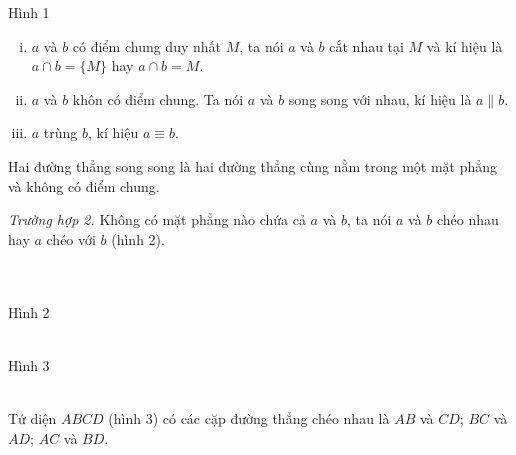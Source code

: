 \begin{center}
Hình 1
\end{center}
\begin{enumerate}[i)]
\item $a$ và $b$ có điểm chung duy nhất $M$, ta nói $a$ và $b$ cắt nhau tại $M$ và kí hiệu là $a\cap b=\{M\}$ hay $a\cap b=M$.
\item $a$ và $b$ khôn có điểm chung. Ta nói $a$ và $b$ song song với nhau, kí hiệu là $a\parallel b$.
\item $a$ trùng $b$, kí hiệu $a\equiv b$.
\end{enumerate}
\begin{note}
Hai đường thẳng song song là hai đường thẳng cùng nằm trong một mặt phẳng và không có điểm chung.
\end{note}
\textit{Trường hợp 2.} Không có mặt phẳng nào chứa cả $a$ và $b$, ta nói $a$ và $b$ chéo nhau hay $a$ chéo với $b$ (hình 2).\\
\begin{minipage}{0.5\textwidth}
\begin{center}
\\
\text{}\\
Hình 2
\end{center}
\end{minipage}
\begin{minipage}{0.5\textwidth}
\begin{center}
\\
Hình 3
\end{center}
\end{minipage}\\
Tứ diện $ABCD$ (hình 3) có các cặp đường thẳng chéo nhau là $AB$ và $CD$; $BC$ và $AD$; $AC$ và $BD$.
